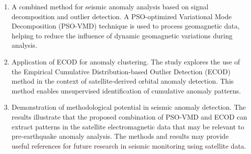 \documentclass[3p,authoryear,preprint,12pt]{elsarticle}
\begin{document}
\begin{enumerate}
	\item {A combined method for seismic anomaly analysis based on signal decomposition and outlier detection. A PSO-optimized Variational Mode Decomposition (PSO-VMD) technique is used to process geomagnetic data, helping to reduce the influence of dynamic geomagnetic variations during analysis.}
	
	\item {Application of ECOD for anomaly clustering. The study explores the use of the Empirical Cumulative Distribution-based Outlier Detection (ECOD) method in the context of satellite-derived orbital anomaly detection. This method enables unsupervised identification of cumulative anomaly patterns.}
	
	\item {Demonstration of methodological potential in seismic anomaly detection. The results illustrate that the proposed combination of PSO-VMD and ECOD can extract patterns in the satellite electromagnetic data that may be relevant to pre-earthquake anomaly analysis. The methods and results may provide useful references for future research in seismic monitoring using satellite data.}
\end{enumerate}
\end{document}
